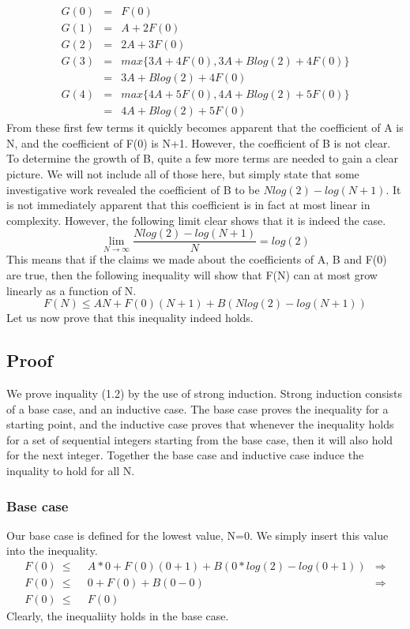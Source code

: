 \begin{eqnarray*}
	G(0) &=& F(0) \\
	G(1) &=& A + 2F(0) \\
	G(2) &=& 2A + 3F(0) \\
	G(3) &=& max\{3A + 4F(0), 3A + Blog(2) + 4F(0)\} \\
	&=& 3A + Blog(2) + 4F(0) \\
	G(4) &=& max\{4A + 5F(0), 4A + Blog(2) + 5F(0)\} \\
	&=& 4A + Blog(2) + 5F(0)
\end{eqnarray*}
From these first few terms it quickly becomes apparent that the coefficient of A is N, and the coefficient of F(0) is N+1. However, the coefficient of B is not clear. To determine the growth of B, quite a few more terms are needed to gain a clear picture. We will not include all of those here, but simply state that some investigative work revealed the coefficient of B to be $Nlog(2)-log(N+1)$. It is not immediately apparent that this coefficient is in fact at most linear in complexity. However, the following limit clear shows that it is indeed the case.
$$\lim_{N\to\infty} \frac{Nlog(2)-log(N+1)}{N} = log(2)$$
This means that if the claims we made about the coefficients of A, B and F(0) are true, then the following inequality will show that F(N) can at most grow linearly as a function of N.
\begin{equation}
F(N) \le AN + F(0)(N+1) + B(Nlog(2)-log(N+1)) 	
\end{equation}
Let us now prove that this inequality indeed holds.
\subsection{Proof}
We prove inquality (1.2) by the use of strong induction. Strong induction consists of a base case, and an inductive case. The base case proves the inequality for a starting point, and the inductive case proves that whenever the inequality holds for a set of sequential integers starting from the base case, then it will also hold for the next integer. Together the base case and inductive case induce the inquality to hold for all N. 
\subsubsection{Base case}
Our base case is defined for the lowest value, N=0. We simply insert this value into the inequality.
\begin{align*}
F(0)\ \le&\ \  A*0 + F(0)(0+1) + B(0*log(2)-log(0+1)) & \Rightarrow \\
F(0)\ \le&\ \  0 + F(0) + B(0-0) & \Rightarrow \\
F(0)\ \le&\ \  F(0) &
\end{align*}
Clearly, the inequaliity holds in the base case.

